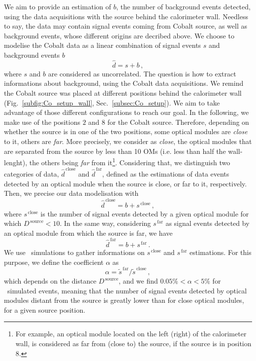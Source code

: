 We aim to provide an estimation of $b$, the number of background events detected, using the data acquisitions with the source behind the calorimeter wall.
Needless to say, the data may contain signal events coming from Cobalt source, as well as background events, whose different origins are decribed above.
We choose to modelise the Cobalt data as a linear combination of signal events $s$ and background events $b$
\begin{equation}
  \hat{d}=s+b\,,
  \label{eq:estimation_data}
\end{equation}
where $s$ and $b$ are considered as uncorrelated.
The question is how to extract informations about background, using the Cobalt data acquisitions.
We remind the Cobalt source was placed at different positions behind the calorimeter wall (Fig.~\ref{subfig:Co_setup_wall}, Sec.~\ref{subsec:Co_setup}).
We aim to take advantage of those different configurations to reach our goal.
In the following, we make use of the positions $2$ and $8$ for the Cobalt source.
Therefore, depending on whether the source is in one of the two positions, some optical modules are \emph{close} to it, others are \emph{far}.
More precisely, we consider as \emph{close}, the optical modules that are separated from the source by less than 10 OMs (i.e. less than half the wall-lenght), the others being \emph{far} from it\footnote{For example, an optical module located on the left (right) of the calorimeter wall, is considered as far from (close to) the source, if the source is in position $8$.}.
Considering that, we distinguish two categories of data, $\hat{d}^{\,\text{close}}$ and $\hat{d}^{\,\text{far}}$, defined as the estimations of data events detected by an optical module when the source is close, or far to it, respectively.
Then, we precise our data modelisation with
\begin{equation}
  \hat{d}^{\,\text{close}} = b + s^{\,\text{close}}\,,
  \label{eq:estimation_data_close}
\end{equation}
where $s^{\,\text{close}}$ is the number of signal events detected by a given optical module for which $D^{\,\text{source}}<10$.
In the same way, considering $s^{\,\text{far}}$ as signal events detected by an optical module from which the source is far, we have
\begin{equation}
  \hat{d}^{\,\text{far}} = b + s^{\,\text{far}}\,.
  \label{eq:estimation_data_far}
\end{equation}
We use \Co\ simulations to gather informations on $s^{\,\text{close}}$ and $s^{\,\text{far}}$ estimations.
For this purpose, we define the coefficient $\alpha$ as
\begin{equation}
  \alpha = \tilde{s}^{\,\text{far}}/\tilde{s}^{\,\text{close}}\,,
\end{equation}
which depends on the distance $D^{\,\text{source}}$, and we find $0.05 \% < \alpha < 5 \%$ for \Co\ simulated events, meaning that the number of signal events detected by optical modules distant from the source is greatly lower than for close optical modules, for a given source position.

